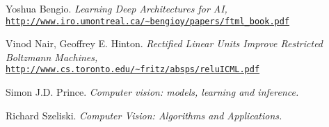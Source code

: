 \begin{thebibliography}{9}
Yoshua Bengio. \textit{Learning Deep Architectures for AI,}
\\\texttt{\url{http://www.iro.umontreal.ca/~bengioy/papers/ftml_book.pdf}}

Vinod Nair, Geoffrey E. Hinton. \textit{Rectified Linear Units Improve Restricted Boltzmann Machines,}
\\\texttt{\url{http://www.cs.toronto.edu/~fritz/absps/reluICML.pdf}}

Simon J.D. Prince. \textit{Computer vision: models, learning and inference.}

Richard Szeliski. \textit{Computer Vision: Algorithms and Applications.}

\end{thebibliography}